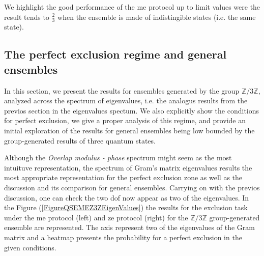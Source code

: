 \documentclass[12pt,letterpaper]{article}
\begin{document}

We highlight the good performance of the \gls{me} protocol up to limit values were the result tends to $\frac{2}{3}$ when the ensemble is made of indistingible states (i.e. the same state). 

\subsection{The perfect exclusion regime and general ensembles}\label{sectionPerfectExclusionRegimeAndGeneralEnsembles}

\hspace{20pt}In this section, we present the results for ensembles generated by the group $\mathbb{Z}/3\mathbb{Z}$, analyzed across the spectrum of eigenvalues, i.e. the analogus results from the previos section in the eigenvalues spectum. We also explicitly show the conditions for perfect exclusion, we give a proper analysis of this regime, and provide an initial exploration of the results for general ensembles being low bounded by the group-generated results of three quantum states.

Although the \emph{Overlap modulus - phase} spectrum might seem as the most intuituve representation, the spectrum of Gram's matrix eigenvalues results the most appropriate representation for the perfect exclusion zone as well as the discussion and its comparison for general ensembles. Carrying on with the previos discussion, one can check the two \gls{dof} now appear as two of the eigenvalues. In the Figure (\ref{FigureQSEMEZ3ZEigenValues}) the results for the exclusion task under the \gls{me} protocol (left) and \gls{ze} protocol (right) for the $\mathbb{Z}/3\mathbb{Z}$ group-generated ensemble are represented. The axis represent two of the eigenvalues of the Gram matrix and a heatmap presents the probability for a perfect exclusion in the given conditions.
\end{document}
